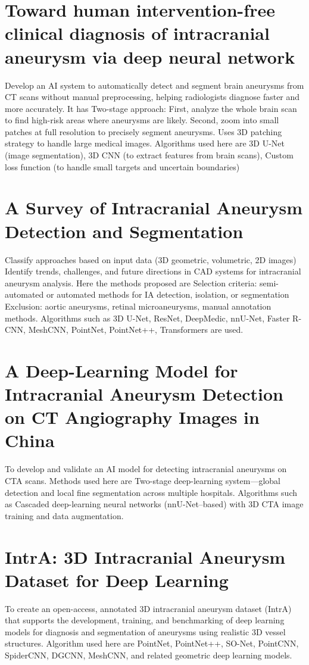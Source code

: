 \documentclass[twoside,a4paper,openright]{report} %
\begin{document}
\section{\textbf{Toward human intervention-free clinical diagnosis of intracranial aneurysm  via deep neural network}}
\sloppy
Develop an AI system to automatically detect and segment brain aneurysms from CT scans without manual preprocessing, helping radiologists diagnose faster and more accurately. It has Two-stage approach: First, analyze the whole brain scan to find high-risk areas where aneurysms are likely. Second, zoom into small patches at full resolution to precisely segment aneurysms. Uses 3D patching strategy to handle large medical images. Algorithms used here are 3D U-Net (image segmentation), 3D CNN (to extract features from brain scans), Custom loss function (to handle small targets and uncertain boundaries)

\section{\textbf{A Survey of Intracranial Aneurysm Detection and Segmentation}}
\sloppy
Classify approaches based on input data (3D geometric, volumetric, 2D images)
Identify trends, challenges, and future directions in CAD systems for intracranial aneurysm analysis. Here the methods proposed are Selection criteria: semi-automated or automated methods for IA detection, isolation, or segmentation
Exclusion: aortic aneurysms, retinal microaneurysms, manual annotation methods. Algorithms such as 3D U-Net, ResNet, DeepMedic, nnU-Net, Faster R-CNN, MeshCNN, PointNet, PointNet++, Transformers are used.

\section{\textbf{A Deep-Learning Model for Intracranial Aneurysm Detection on CT Angiography Images in China}}
\sloppy
To develop and validate an AI model for detecting intracranial aneurysms on CTA scans. Methods used here are Two-stage deep-learning system---global detection and local fine segmentation across multiple hospitals. Algorithms such as Cascaded deep-learning neural networks (nnU-Net--based) with 3D CTA image training and data augmentation.

\section{\textbf{IntrA: 3D Intracranial Aneurysm Dataset for  Deep Learning}}
\sloppy
To create an open-access, annotated 3D intracranial aneurysm dataset (IntrA) that supports the development, training, and benchmarking of deep learning models for diagnosis and segmentation of aneurysms using realistic 3D vessel structures. Algorithm used here are PointNet, PointNet++, SO-Net, PointCNN, SpiderCNN, DGCNN, MeshCNN, and related geometric deep learning models.
\end{document}
